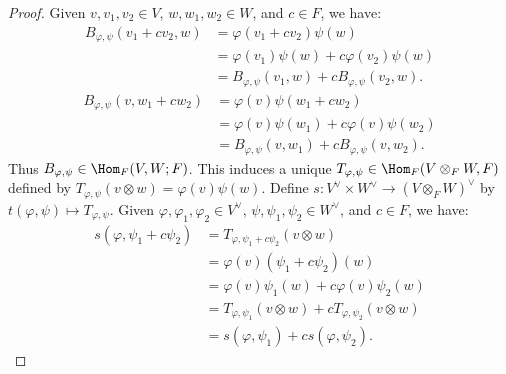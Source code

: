 \documentclass[10pt,twoside,openany]{memoir}
\begin{document}
        \begin{proof}
            Given $v,v_1,v_2 \in V$, $w,w_1,w_2 \in W$, and $c \in F$, we have:
                \begin{equation*}
                \begin{split}
                    B_{\varphi,\psi}(v_1 + cv_2,w)
                    & = \varphi(v_1 + cv_2)\psi(w)\\
                    & = \varphi(v_1)\psi(w) + c\varphi(v_2)\psi(w) \\
                    & = B_{\varphi,\psi}(v_1,w) + c B_{\varphi,\psi}(v_2,w).
                \end{split}
                \end{equation*}
                \begin{equation*}
                \begin{split}
                    B_{\varphi,\psi}(v,w_1 + cw_2)
                    & = \varphi(v)\psi(w_1 +c w_2) \\
                    & = \varphi(v)\psi(w_1) + c\varphi(v)\psi(w_2) \\
                    & = B_{\varphi,\psi}(v,w_1) +c B_{\varphi,\psi}(v,w_2).
                \end{split}
                \end{equation*}
            Thus $B_{\varphi,\psi} \in \Hom_F(V,W;F)$. This induces a unique $T_{\varphi,\psi} \in \Hom_F(V \otimes_F W,F)$ defined by $T_{\varphi,\psi}(v \otimes w) = \varphi(v)\psi(w)$. Define $s:V^\vee \times W^\vee \rightarrow (V \otimes_F W)^\vee$ by $t(\varphi,\psi) \mapsto T_{\varphi,\psi}$. Given $\varphi,\varphi_1,\varphi_2 \in V^\vee$, $\psi,\psi_1,\psi_2 \in W^\vee$, and $c \in F$, we have:
                \begin{equation*}
                \begin{split}
                    s(\varphi,\psi_1 + c\psi_2)
                    & = T_{\varphi,\psi_1 + c \psi_2}(v \otimes w) \\
                    & = \varphi(v)(\psi_1 + c\psi_2)(w) \\
                    & = \varphi(v)\psi_1(w) + c \varphi(v)\psi_2(w) \\
                    & = T_{\varphi,\psi_1}(v \otimes w) + c T_{\varphi,\psi_2}(v \otimes w) \\
                    & = s(\varphi,\psi_1) + c s(\varphi,\psi_2).
                \end{split}
                \end{equation*}

\end{proof}
\end{document}
